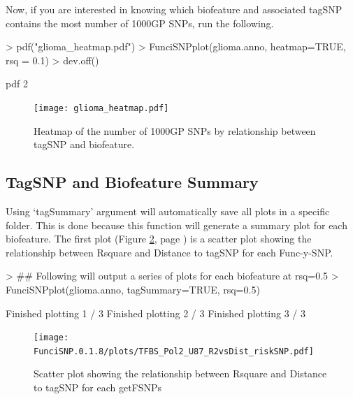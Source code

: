 \documentclass[12pt,fullpage]{article}
\begin{document}
Now, if you are interested in knowing which biofeature and associated tagSNP
contains the most number of 1000GP SNPs, run the following.

\begin{Schunk}
\begin{Sinput}
> pdf("glioma_heatmap.pdf")
> FunciSNPplot(glioma.anno, heatmap=TRUE, rsq = 0.1)
> dev.off()
\end{Sinput}
\begin{Soutput}
pdf 
  2 
\end{Soutput}
\end{Schunk}

\begin{figure}[ht!]
\begin{center}
\texttt{[image: glioma\_heatmap.pdf]}
\caption{\label{fig:glioma_heatmap.pdf} Heatmap of the number of 1000GP SNPs by
    relationship between tagSNP and biofeature.}
{\footnotesize{}}
\end{center}
\end{figure}

\subsection{TagSNP and Biofeature Summary}

Using `tagSummary' argument will automatically save all plots in a specific
folder. This is done because this function will generate a summary plot for each
biofeature. The first plot (Figure \ref{fig:TFBS_Pol2_U87_R2vsDist_riskSNP.pdf},
        page \pageref{fig:TFBS_Pol2_U87_R2vsDist_riskSNP.pdf}) is a scatter plot
showing the relationship between Rsquare and Distance to tagSNP for each
Func-y-SNP.

\begin{Schunk}
\begin{Sinput}
> ## Following will output a series of plots for each biofeature at rsq=0.5
> FunciSNPplot(glioma.anno, tagSummary=TRUE, rsq=0.5)
\end{Sinput}
\begin{Soutput}
Finished plotting  1 / 3 
Finished plotting  2 / 3 
Finished plotting  3 / 3 
\end{Soutput}
\end{Schunk}

\begin{figure}[ht!]
\begin{center}
\texttt{[image: FunciSNP.0.1.8/plots/TFBS\_Pol2\_U87\_R2vsDist\_riskSNP.pdf]}
\caption{\label{fig:TFBS_Pol2_U87_R2vsDist_riskSNP.pdf} Scatter plot 
showing the relationship between Rsquare and Distance to tagSNP for each 
getFSNPs}
{\footnotesize{}}
\end{center}
\end{figure}
\end{document}
